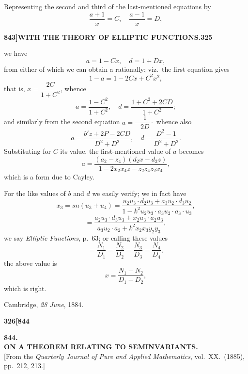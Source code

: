 \documentclass[11pt,a4paper]{book}
\begin{document}
Representing the second and third of the last-mentioned equations by
\[
\frac{a + 1}{x} = C, \quad \frac{a - 1}{x} = D,
\]

\newpage
\setcounter{page}{325}

\noindent\textbf{843]}\hfill\textbf{WITH THE THEORY OF ELLIPTIC FUNCTIONS.}\hfill\textbf{325}

\bigskip

\noindent we have
\[
a = 1 - Cx, \quad d = 1 + Dx,
\]
from either of which we can obtain a rationally; viz.\ the first equation gives
\[
1 - a = 1 - 2Cx + C^2x^2,
\]
that is, $x = \dfrac{2C}{1 + C^2}$, whence
\[
a = \frac{1 - C^2}{1 + C^2}, \quad d = \frac{1 + C^2 + 2CD}{1 + C^2};
\]
and similarly from the second equation $a = -\dfrac{1}{2D}\cdot$ whence also
\[
a = \frac{b'z + 2P - 2CD}{D^2 + D^2}, \quad d = \frac{D^2 - 1}{D^2 + D^2}.
\]
Substituting for $C$ its value, the first-mentioned value of $a$ becomes
\[
a = \frac{(a_2 - z_4)(d_2x - d_2z)}{1 - 2x_2x_4z - z_2z_4z_2x_4},
\]
which is a form due to Cayley.

For the like values of $b$ and $d$ we easily verify; we in fact have
\[
x_3 = sn(u_3 + u_4) = \frac{u_2u_3 \cdot d_2u_3 + a_3u_2 \cdot d_3u_2}{1 - k^2u_2u_3 \cdot a_3u_2 \cdot a_3 \cdot u_3},
\]
\[
= \frac{a_2u_3 \cdot d_3u_3 + x_2u_3 \cdot a_2u_3}{a_3u_2 \cdot a_2 + k^2x_2x_3y_2y_3},
\]
we say \textit{Elliptic Functions}, p.\ 63; or calling these values
\[
= \frac{N_1}{D_1} = \frac{N_2}{D_2} = \frac{N_3}{D_3} = \frac{N_4}{D_4},
\]
the above value is
\[
x = \frac{N_1 - N_2}{D_1 - D_2},
\]
which is right.

\smallskip
\hfill Cambridge, \textit{28 June}, 1884.

\vspace{2em}


\newpage
\setcounter{page}{326}

\noindent\textbf{326}\hfill\textbf{[844}

\bigskip

\begin{center}
{\Large\textbf{844.}}\\[1em]
{\large\textbf{ON A THEOREM RELATING TO SEMINVARIANTS.}}\\[1em]
[From the \textit{Quarterly Journal of Pure and Applied Mathematics}, vol.\ XX.\ (1885), pp.\ 212, 213.]
\end{center}
\end{document}
